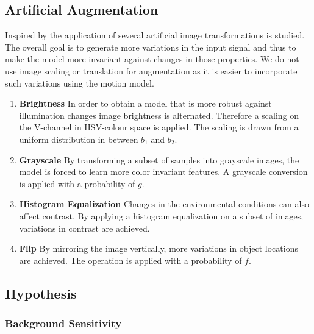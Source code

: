 \subsection{Artificial Augmentation}

Inspired by \cite{Howard2013, Redmon, Liu} the application of several artificial image transformations is studied. The overall goal is to generate more variations in the input signal and thus to make the model more invariant against changes in those properties. We do not use image scaling or translation for augmentation as it is easier to incorporate such variations using the motion model.

\begin{enumerate}
	\item \textbf{Brightness} In order to obtain a model that is more robust against illumination changes image brightness is alternated. Therefore a scaling on the V-channel in HSV-colour space is applied. The scaling is drawn from a uniform distribution in between $b_1$ and $b_2$.
	
	\item \textbf{Grayscale} By transforming a subset of samples into grayscale images, the model is forced to learn more color invariant features. A grayscale conversion is applied with a probability of $g$.
	
	\item \textbf{Histogram Equalization} Changes in the environmental conditions can also affect contrast. By applying a histogram equalization on a subset of images, variations in contrast are achieved. 
	
	\item \textbf{Flip} By mirroring the image vertically, more variations in object locations are achieved. The operation is applied with a probability of $f$.
\end{enumerate}


\subsection{Hypothesis}
\label{sec:training:hypothesis}

\subsubsection{Background Sensitivity}

